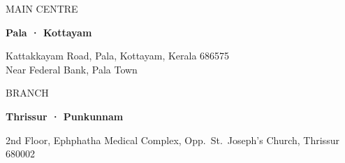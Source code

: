 \documentclass[10pt,a4paper]{article}
\newcommand{\ut}[2][olive]{{\utility\fontsize{7}{9}\selectfont\color{#1}#2}}
\begin{document}
\vspace{7mm}
\noindent
\begin{minipage}[t]{0.485\linewidth}
\begin{tcolorbox}[colback=honeydew,colframe=honeydew,arc=3mm,height=40mm,left=4.5mm,right=4.5mm,top=3.5mm,bottom=3.5mm]
  \color{darkmoss}
  \ut[olive]{MAIN CENTRE}\par\vspace{0.4mm}
  {\serifhead\bfseries\large Pala · Kottayam}\par\vspace{0.4mm}
  {\small Kattakkayam Road, Pala, Kottayam, Kerala 686575\\Near Federal Bank, Pala Town}
\end{tcolorbox}
\end{minipage}\hfill
\begin{minipage}[t]{0.485\linewidth}
\begin{tcolorbox}[colback=honeydew,colframe=honeydew,arc=3mm,height=40mm,left=4.5mm,right=4.5mm,top=3.5mm,bottom=3.5mm]
  \color{darkmoss}
  \ut[olive]{BRANCH}\par\vspace{0.4mm}
  {\serifhead\bfseries\large Thrissur · Punkunnam}\par\vspace{0.4mm}
  {\small 2nd Floor, Ephphatha Medical Complex, Opp.\ St.\ Joseph's Church, Thrissur 680002}
\end{tcolorbox}
\end{minipage}
\end{document}
